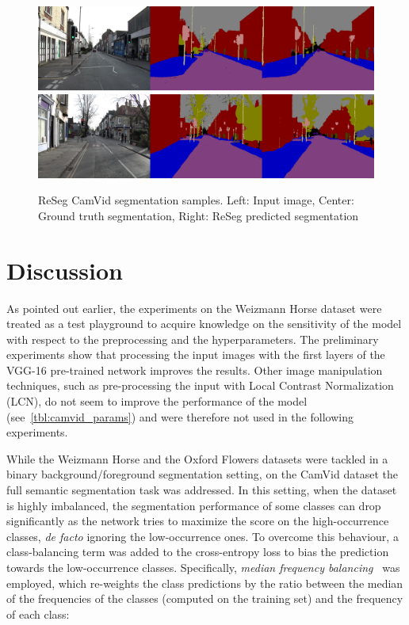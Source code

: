 \begin{figure}[t!]
    \centering
    \includegraphics[width=\textwidth]{img/reseg/samples/camvid1.png}\\
    \vspace{0.1em}
    \includegraphics[width=\textwidth]{img/reseg/samples/camvid2.png}
    \caption{ReSeg CamVid segmentation samples.
        Left: Input image, Center: Ground truth segmentation,
        Right: ReSeg predicted segmentation}
    \label{fig:reseg_samples_camvid}
\end{figure}


\section{Discussion}

As pointed out earlier, the experiments on the Weizmann Horse dataset were
treated as a test playground to acquire knowledge on the sensitivity of the
model with respect to the preprocessing and the hyperparameters. The
preliminary experiments show that processing the input images with the first
layers of the VGG-16 pre-trained network improves the results. Other image
manipulation techniques, such as pre-processing the input with Local Contrast
Normalization (LCN), do not seem to improve the performance of the model
(see~\autoref{tbl:camvid_params}) and were therefore not used in the following
experiments.

While the Weizmann Horse and the Oxford Flowers datasets were tackled in a
binary background/foreground segmentation setting, on the CamVid dataset the
full semantic segmentation task was addressed. In this setting, when the
dataset is highly imbalanced, the segmentation performance of some classes can
drop significantly as the network tries to maximize the score on the
high-occurrence classes, {\em de facto} ignoring the low-occurrence ones. To
overcome this behaviour, a class-balancing term was added to the cross-entropy
loss to bias the prediction towards the low-occurrence classes. Specifically,
\emph{median frequency balancing}~\cite{Eigen2015,eigen2015predicting} was
employed, which re-weights the class predictions by the ratio between the
median of the frequencies of the classes (computed on the training set) and the
frequency of each class:

